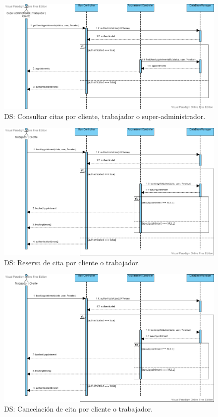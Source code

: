 \begin{figure}[H]
  \centering
  \includegraphics[scale=0.38]{images/Consultar_citas.png}
  \caption{DS: Consultar citas por cliente, trabajador o super-administrador.}
  \label{DS1}
\end{figure}

\begin{figure}[H]
  \centering
  \includegraphics[scale=0.36]{images/Rerservar_cita.png}
  \caption{DS: Reserva de cita por cliente o trabajador.}
  \label{DS1}
\end{figure}

\begin{figure}[H]
  \centering
  \includegraphics[scale=0.36]{images/Rerservar_cita.png}
  \caption{DS: Cancelación de cita por cliente o trabajador.}
  \label{DS1}
\end{figure}


